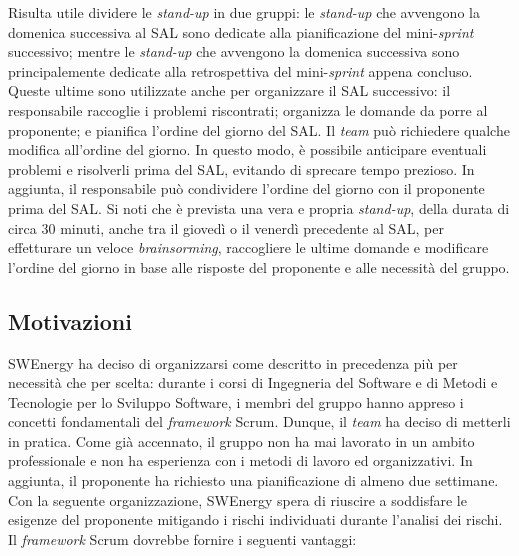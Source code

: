 Risulta utile dividere le \textit{stand-up} in due gruppi: le \textit{stand-up}
che avvengono la domenica successiva al SAL sono dedicate alla pianificazione
del mini-\textit{sprint} successivo; mentre le \textit{stand-up} che avvengono
la domenica successiva sono principalemente dedicate alla retrospettiva del
mini-\textit{sprint} appena concluso. Queste ultime sono utilizzate anche per
organizzare il SAL successivo: il responsabile raccoglie i problemi riscontrati;
organizza le domande da porre al proponente; e pianifica l'ordine del giorno del
SAL. Il \textit{team} può richiedere qualche modifica all'ordine del giorno. In
questo modo, è possibile anticipare eventuali problemi e risolverli prima del
SAL, evitando di sprecare tempo prezioso. In aggiunta, il responsabile può
condividere l'ordine del giorno con il proponente prima del SAL. Si noti
che è prevista una vera e propria \textit{stand-up}, della durata di circa 30
minuti, anche tra il giovedì o il venerdì precedente al SAL, per effetturare un
veloce \textit{brainsorming}, raccogliere le ultime domande e modificare
l'ordine del giorno in base alle risposte del proponente e alle necessità del
gruppo.

\subsection{Motivazioni}

SWEnergy ha deciso di organizzarsi come descritto in precedenza più per
necessità che per scelta: durante i corsi di Ingegneria del Software e di Metodi
e Tecnologie per lo Sviluppo Software, i membri del gruppo hanno appreso i
concetti fondamentali del \textit{framework} Scrum. Dunque, il \textit{team} ha
deciso di metterli in pratica. Come già accennato, il gruppo non ha mai lavorato
in un ambito professionale e non ha esperienza con i metodi di lavoro ed
organizzativi. In aggiunta, il proponente ha richiesto una pianificazione di
almeno due settimane.
Con la seguente organizzazione, SWEnergy spera di riuscire a soddisfare le
esigenze del proponente mitigando i rischi individuati durante l'analisi dei
rischi. Il \textit{framework} Scrum dovrebbe fornire i seguenti vantaggi:


